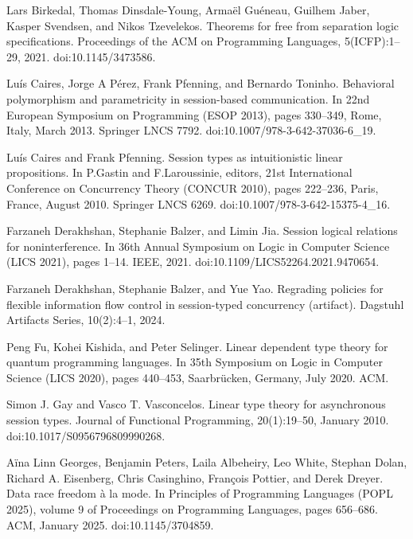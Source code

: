 \par\noindent  [10]  Lars Birkedal, Thomas Dinsdale-Young, Armaël Guéneau, Guilhem Jaber, Kasper Svendsen, and Nikos Tzevelekos.  Theorems for free from separation logic specifications.  Proceedings of the ACM on Programming Languages, 5(ICFP):1–29, 2021.  doi:10.1145/3473586.  
 
\par\noindent  [11]  Luís Caires, Jorge A Pérez, Frank Pfenning, and Bernardo Toninho.  Behavioral polymorphism and parametricity in session-based communication.  In 22nd European Symposium on Programming (ESOP 2013), pages 330–349, Rome, Italy, March 2013. Springer LNCS 7792.  doi:10.1007/978-3-642-37036-6\_19.  
 
\par\noindent  [12]  Luís Caires and Frank Pfenning.  Session types as intuitionistic linear propositions.  In P.Gastin and F.Laroussinie, editors, 21st International Conference on Concurrency Theory (CONCUR 2010), pages 222–236, Paris, France, August 2010. Springer LNCS 6269.  doi:10.1007/978-3-642-15375-4\_16.  
 
\par\noindent  [13]  Farzaneh Derakhshan, Stephanie Balzer, and Limin Jia.  Session logical relations for noninterference.  In 36th Annual Symposium on Logic in Computer Science (LICS 2021), pages 1–14. IEEE, 2021.  doi:10.1109/LICS52264.2021.9470654.  
 
\par\noindent  [14]  Farzaneh Derakhshan, Stephanie Balzer, and Yue Yao.  Regrading policies for flexible information flow control in session-typed concurrency (artifact).  Dagstuhl Artifacts Series, 10(2):4–1, 2024.  
 
\par\noindent  [15]  Peng Fu, Kohei Kishida, and Peter Selinger.  Linear dependent type theory for quantum programming languages.  In 35th Symposium on Logic in Computer Science (LICS 2020), pages 440–453, Saarbrücken, Germany, July 2020. ACM.  
 
\par\noindent  [16]  Simon J. Gay and Vasco T. Vasconcelos.  Linear type theory for asynchronous session types.  Journal of Functional Programming, 20(1):19–50, January 2010.  doi:10.1017/S0956796809990268.  
 
\par\noindent  [17]  Aïna Linn Georges, Benjamin Peters, Laila Albeheiry, Leo White, Stephan Dolan, Richard A. Eisenberg, Chris Casinghino, François Pottier, and Derek Dreyer.  Data race freedom à la mode.  In Principles of Programming Languages (POPL 2025), volume 9 of Proceedings on Programming Languages, pages 656–686. ACM, January 2025.  doi:10.1145/3704859.  
 
